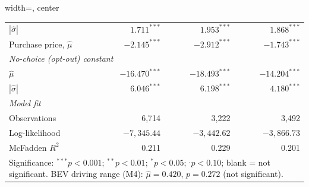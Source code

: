 \documentclass[a4paper,fleqn]{cas-sc}   %
\begin{document}
\begin{table}[pos=H]
\begin{adjustbox}{width=\textwidth, center}
{\begin{tabular}{lrrr}
\quad\quad $|\hat{\sigma}|$          & $1.711^{***}$   & $1.953^{***}$   & $1.868^{***}$  \\[3pt]
\quad Purchase price, $\hat{\mu}$    & $-2.145^{***}$  & $-2.912^{***}$  & $-1.743^{***}$ \\[3pt]
\multicolumn{4}{l}{\textit{No-choice (opt-out) constant}} \\[2pt]
\quad $\hat{\mu}$                    & $-16.470^{***}$ & $-18.493^{***}$ & $-14.204^{***}$\\
\quad\quad $|\hat{\sigma}|$          & $6.046^{***}$   & $6.198^{***}$   & $4.180^{***}$  \\
\midrule
\multicolumn{4}{l}{\textit{Model fit}} \\[2pt]
\quad Observations                   & 6,714           & 3,222           & 3,492          \\
\quad Log-likelihood                 & $-7{,}345.44$   & $-3{,}442.62$   & $-3{,}866.73$  \\
\quad McFadden $R^{2}$               & 0.211           & 0.229           & 0.201          \\
\bottomrule
\multicolumn{4}{p{\dimexpr\linewidth-2\tabcolsep\relax}}{\footnotesize
  Significance: $^{***}p<0.001$; $^{**}p<0.01$; $^{*}p<0.05$; $^{.}p<0.10$; blank = not significant. BEV driving range (M4): $\hat{\mu} = 0.420$, $p = 0.272$ (not significant).} \\
\end{tabular}}
\end{adjustbox}
\end{table}
\end{document}
